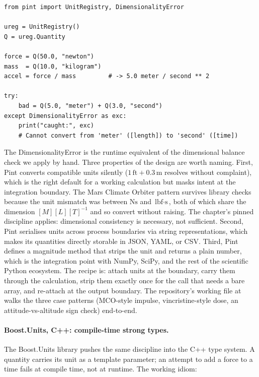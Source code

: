 \begin{verbatim}
from pint import UnitRegistry, DimensionalityError

ureg = UnitRegistry()
Q = ureg.Quantity

force = Q(50.0, "newton")
mass  = Q(10.0, "kilogram")
accel = force / mass         # -> 5.0 meter / second ** 2

try:
    bad = Q(5.0, "meter") + Q(3.0, "second")
except DimensionalityError as exc:
    print("caught:", exc)
    # Cannot convert from 'meter' ([length]) to 'second' ([time])
\end{verbatim}

The DimensionalityError is the runtime equivalent of the dimensional
balance check we apply by hand. Three properties of the design are
worth naming. First, Pint converts compatible units silently
($1 \,\text{ft} + 0.3 \,\si{\meter}$ resolves without complaint),
which is the right default for a working calculation but masks
intent at the integration boundary. The Mars Climate Orbiter pattern
survives library checks because the unit mismatch was between
$\si{\newton\second}$ and $\text{lbf} \cdot \text{s}$, both of which
share the dimension $[M][L][T]^{-1}$ and so convert without raising.
The chapter's pinned discipline applies: dimensional consistency is
necessary, not sufficient. Second, Pint serialises units across
process boundaries via string representations, which makes its
quantities directly storable in JSON, YAML, or CSV. Third, Pint
defines a magnitude method that strips the unit and returns a plain
number, which is the integration point with NumPy, SciPy, and the
rest of the scientific Python ecosystem. The recipe is: attach units
at the boundary, carry them through the calculation, strip them
exactly once for the call that needs a bare array, and re-attach at
the output boundary. The repository's working file at
walks the three case patterns
(MCO-style impulse, vincristine-style dose, an attitude-vs-altitude
sign check) end-to-end.

\paragraph{Boost.Units, C++: compile-time strong types.}
The Boost.Units library \cite{web:ch02t3-boost-units} pushes the
same discipline into the C++ type system. A quantity carries its
unit as a template parameter; an attempt to add a force to a time
fails at compile time, not at runtime. The working idiom:

